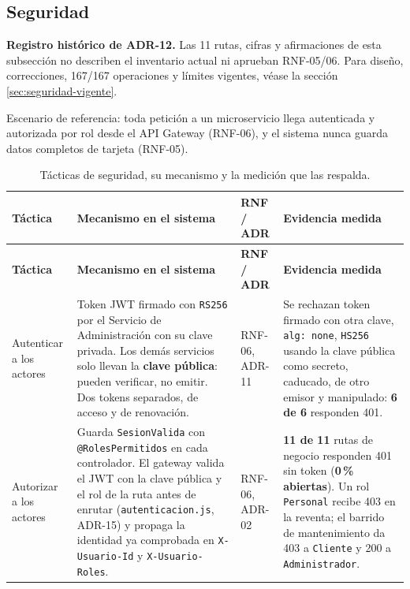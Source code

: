 \documentclass[11pt,a4paper]{article}
\begin{document}
\subsection{Seguridad}
\textbf{Registro histórico de ADR-12.} Las 11 rutas, cifras y afirmaciones de esta
subsección no describen el inventario actual ni aprueban RNF-05/06.
Para diseño, correcciones, 167/167 operaciones y límites vigentes, véase
la sección \ref{sec:seguridad-vigente}.

Escenario de referencia: toda petición a un microservicio llega autenticada y autorizada por rol
desde el API Gateway (RNF-06), y el sistema nunca guarda datos completos de tarjeta (RNF-05).

\begin{center}
\begin{longtable}{|>{\raggedright\arraybackslash}p{2.9cm}|>{\raggedright\arraybackslash}p{5.1cm}|>{\raggedright\arraybackslash}p{1.7cm}|>{\raggedright\arraybackslash}p{3.7cm}|}
\caption{Tácticas de seguridad, su mecanismo y la medición que las respalda.}\label{tab:tacticas-seguridad}\\
\hline
\textbf{Táctica} & \textbf{Mecanismo en el sistema} & \textbf{RNF / ADR} & \textbf{Evidencia medida}\\
\hline
\endfirsthead
\hline
\textbf{Táctica} & \textbf{Mecanismo en el sistema} & \textbf{RNF / ADR} & \textbf{Evidencia medida}\\
\hline
\endhead

Autenticar a los actores &
Token JWT firmado con \texttt{RS256} por el Servicio de Administración con su clave privada. Los
demás servicios solo llevan la \textbf{clave pública}: pueden verificar, no emitir. Dos tokens
separados, de acceso y de renovación. &
RNF-06, ADR-11 &
Se rechazan token firmado con otra clave, \texttt{alg: none}, \texttt{HS256} usando la clave
pública como secreto, caducado, de otro emisor y manipulado: \textbf{6 de 6} responden 401.\\
\hline

Autorizar a los actores &
Guarda \texttt{SesionValida} con \texttt{@RolesPermitidos} en cada controlador. El gateway valida
el JWT con la clave pública y el rol de la ruta antes de enrutar (\texttt{autenticacion.js}, ADR-15)
y propaga la identidad ya comprobada en \texttt{X-Usuario-Id} y \texttt{X-Usuario-Roles}. &
RNF-06, ADR-02 &
\textbf{11 de 11} rutas de negocio responden 401 sin token (\textbf{0\,\% abiertas}). Un rol
\texttt{Personal} recibe 403 en la reventa; el barrido de mantenimiento da 403 a \texttt{Cliente}
y 200 a \texttt{Administrador}.\\
\hline


\end{longtable}
\end{center}
\end{document}

